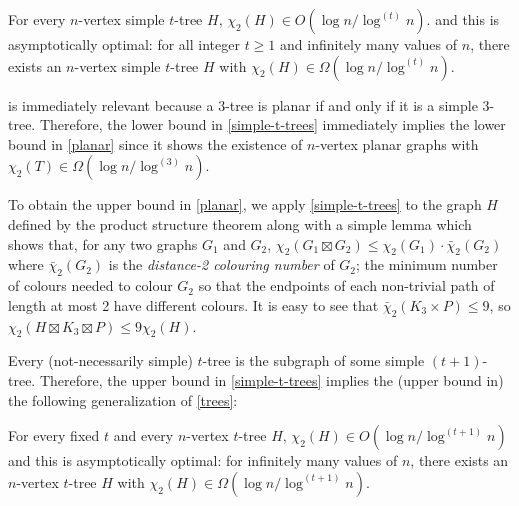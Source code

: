 \documentclass[kpfonts]{patmorin}
\newcommand{\trn}{\chi_2}
\newcommand{\dtcn}{\bar{\chi}_2}
\theoremstyle{named}
\begin{document}
\begin{thm}\label{simple-t-trees}
    For every $n$-vertex simple $t$-tree $H$, $\trn(H) \in O(\log n/\log^{(t)}n)$.
    and this is asymptotically optimal: for all integer $t\ge 1$ and infinitely many values of $n$, there exists an $n$-vertex simple $t$-tree $H$ with $\trn(H)\in\Omega(\log n/\log^{(t)} n)$.
\end{thm}

 is immediately relevant because a 3-tree is planar if and only if it is a simple $3$-tree. Therefore, the lower bound in \cref{simple-t-trees} immediately implies the lower bound in \cref{planar} since it shows the existence of $n$-vertex planar graphs with $\trn(T)\in\Omega(\log n/\log^{(3)} n)$.

To obtain the upper bound in \cref{planar}, we apply \cref{simple-t-trees} to the graph $H$ defined by the product structure theorem along with a simple lemma which shows that, for any two graphs $G_1$ and $G_2$, $\trn(G_1\boxtimes G_2)\le \trn(G_1)\cdot\dtcn(G_2)$ where $\dtcn(G_2)$ is the \emph{distance-2 colouring number} of $G_2$;  the minimum number of colours needed to colour $G_2$ so that the endpoints of each non-trivial path of length at most 2 have different colours.  It is easy to see that $\dtcn(K_3\times P)\le 9$, so $\trn(H\boxtimes K_3\boxtimes P)\le 9\trn(H)$.

%
%


Every (not-necessarily simple) $t$-tree is the subgraph of some simple $(t+1)$-tree. Therefore, the upper bound in \cref{simple-t-trees} implies the (upper bound in) the following generalization of \cref{trees}:

\begin{thm}\label{t-trees}
    For every fixed $t$ and every $n$-vertex $t$-tree $H$, $\trn(H) \in O(\log n/\log^{(t+1)} n)$ and this is asymptotically optimal: for infinitely many values of $n$, there exists an $n$-vertex $t$-tree $H$ with $\trn(H)\in\Omega(\log n/\log^{(t+1)} n)$.
\end{thm}
\end{document}
